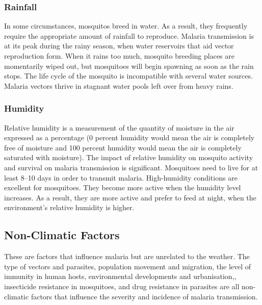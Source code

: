 		\subsubsection{Rainfall}
	In some circumstances, mosquitos breed in water. As a result, they frequently require the appropriate amount of rainfall to reproduce. Malaria transmission is at its peak during the rainy season, when water reservoirs that aid vector reproduction form. When it rains too much, mosquito breeding places are momentarily wiped out, but mosquitoes will begin spawning as soon as the rain stops. The life cycle of the mosquito is incompatible with several water sources. Malaria vectors thrive in stagnant water pools left over from heavy rains.
		
	
		\subsubsection{Humidity}
		Relative humidity is a measurement of the quantity of moisture in the air expressed as a percentage (0 percent humidity would mean the air is completely free of moisture and 100 percent humidity would mean the air is completely saturated with moisture). The impact of relative humidity on mosquito activity and survival on malaria transmission is significant. Mosquitoes need to live for at least 8–10 days in order to transmit malaria. High-humidity conditions are excellent for mosquitoes. They become more active when the humidity level increases. As a result, they are more active and prefer to feed at night, when the environment's relative humidity is higher.
		
		\subsection{Non-Climatic Factors}
		These are factors that influence malaria but are unrelated to the weather. The type of vectors and parasites, population movement and migration, the level of immunity in human hosts, environmental developments and urbanisation,, insecticide resistance in mosquitoes, and drug resistance in parasites are all non-climatic factors that influence the severity and incidence of malaria transmission.
		

